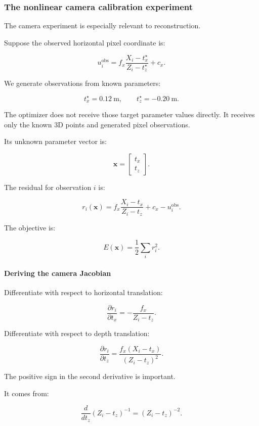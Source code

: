\subsubsection{The nonlinear camera calibration experiment}\label{02-foundations-ii-ch028-the-nonlinear-camera-calibration-experiment}

The camera experiment is especially relevant to reconstruction.

Suppose the observed horizontal pixel coordinate is:

\[
u_i^{\mathrm{obs}} = f_x\frac{X_i-t_x^\star}{Z_i-t_z^\star}+c_x.
\]

We generate observations from known parameters:

\[
\boxed{ t_x^\star=0.12\ \mathrm m, \qquad t_z^\star=-0.20\ \mathrm m }.
\]

The optimizer does not receive those target parameter values directly. It receives only the known 3D points and generated pixel observations.

Its unknown parameter vector is:

\[
\mathbf x= \begin{bmatrix} t_x\\t_z \end{bmatrix}.
\]

The residual for observation \(i\) is:

\[
\boxed{ r_i(\mathbf x) = f_x\frac{X_i-t_x}{Z_i-t_z} +c_x-u_i^{\mathrm{obs}} }.
\]

The objective is:

\[
E(\mathbf x)=\frac12\sum_i r_i^2.
\]

\paragraph{Deriving the camera Jacobian}\label{02-foundations-ii-ch028-deriving-the-camera-jacobian}

Differentiate with respect to horizontal translation:

\[
\boxed{ \frac{\partial r_i}{\partial t_x} = -\frac{f_x}{Z_i-t_z} }.
\]

Differentiate with respect to depth translation:

\[
\boxed{ \frac{\partial r_i}{\partial t_z} = \frac{f_x(X_i-t_x)}{(Z_i-t_z)^2} }.
\]

The positive sign in the second derivative is important.

It comes from:

\[
\frac d{dt_z}(Z_i-t_z)^{-1} = (Z_i-t_z)^{-2}.
\]

